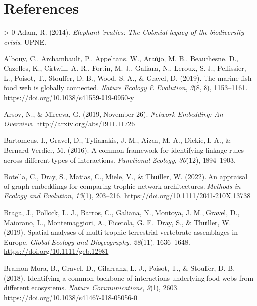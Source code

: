 \documentclass[11pt]{article}
\newlength{\cslhangindent}
\newenvironment{CSLReferences}[3] %
 {%
  \setlength{\parindent}{0pt}
  \ifodd #1 \everypar{\setlength{\hangindent}{\cslhangindent}}\ignorespaces\fi
  \ifnum #2 > 0
  \setlength{\parskip}{#2\baselineskip}
  \fi
 }%
 {}
\begin{document}
\hypertarget{references}{%
\section*{References}\label{references}}

\hypertarget{refs}{}
\begin{CSLReferences}{1}{0}
\leavevmode\hypertarget{ref-Adam2014EleTre}{}%
Adam, R. (2014). \emph{Elephant treaties: The Colonial legacy of the
biodiversity crisis}. UPNE.

\leavevmode\hypertarget{ref-Albouy2019MarFis}{}%
Albouy, C., Archambault, P., Appeltans, W., Araújo, M. B., Beauchesne,
D., Cazelles, K., Cirtwill, A. R., Fortin, M.-J., Galiana, N., Leroux,
S. J., Pellissier, L., Poisot, T., Stouffer, D. B., Wood, S. A., \&
Gravel, D. (2019). The marine fish food web is globally connected.
\emph{Nature Ecology \& Evolution}, \emph{3}(8, 8), 1153--1161.
\url{https://doi.org/10.1038/s41559-019-0950-y}

\leavevmode\hypertarget{ref-Arsov2019NetEmb}{}%
Arsov, N., \& Mirceva, G. (2019, November 26). \emph{Network Embedding:
An Overview}. \url{http://arxiv.org/abs/1911.11726}

\leavevmode\hypertarget{ref-Bartomeus2016ComFra}{}%
Bartomeus, I., Gravel, D., Tylianakis, J. M., Aizen, M. A., Dickie, I.
A., \& Bernard-Verdier, M. (2016). A common framework for identifying
linkage rules across different types of interactions. \emph{Functional
Ecology}, \emph{30}(12), 1894--1903.

\leavevmode\hypertarget{ref-Botella2022AppGra}{}%
Botella, C., Dray, S., Matias, C., Miele, V., \& Thuiller, W. (2022). An
appraisal of graph embeddings for comparing trophic network
architectures. \emph{Methods in Ecology and Evolution}, \emph{13}(1),
203--216. \url{https://doi.org/10.1111/2041-210X.13738}

\leavevmode\hypertarget{ref-Braga2019SpaAna}{}%
Braga, J., Pollock, L. J., Barros, C., Galiana, N., Montoya, J. M.,
Gravel, D., Maiorano, L., Montemaggiori, A., Ficetola, G. F., Dray, S.,
\& Thuiller, W. (2019). Spatial analyses of multi-trophic terrestrial
vertebrate assemblages in Europe. \emph{Global Ecology and
Biogeography}, \emph{28}(11), 1636--1648.
\url{https://doi.org/10.1111/geb.12981}

\leavevmode\hypertarget{ref-BramonMora2018IdeCom}{}%
Bramon Mora, B., Gravel, D., Gilarranz, L. J., Poisot, T., \& Stouffer,
D. B. (2018). Identifying a common backbone of interactions underlying
food webs from different ecosystems. \emph{Nature Communications},
\emph{9}(1), 2603. \url{https://doi.org/10.1038/s41467-018-05056-0}


\end{CSLReferences}
\end{document}
